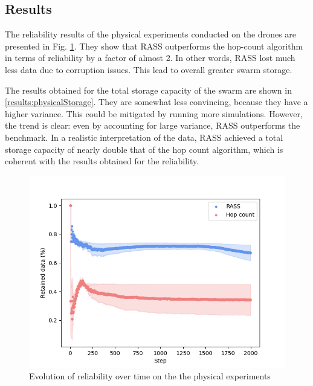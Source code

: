 \subsection{Results}
The reliability results of the physical experiments conducted on the drones are presented in Fig. \ref{results:physicalRelaibility}. They show that \ac{RASS} outperforms the hop-count algorithm in terms of reliability by a factor of almost 2. In other words, \ac{RASS} lost much less data due to corruption issues. This lead to overall greater swarm storage. 

The results obtained for the total storage capacity of the swarm are shown in \ref{results:physicalStorage}. They are somewhat less convincing, because they have a higher variance. This could be mitigated by running more simulations. However, the trend is clear: even by accounting for large variance, \ac{RASS} outperforms the benchmark. In a realistic interpretation of the data, \ac{RASS} achieved a total storage capacity of nearly double that of the hop count algorithm, which is coherent with the results obtained for the reliability.

\begin{figure}[htbp]
	\centering
    \includegraphics[width=\columnwidth]{figures/dora_mesh/reliability.png}
    \caption[RASS physical reliability]{Evolution of reliability over time on the the physical experiments}
    \label{results:physicalRelaibility}
\end{figure}

